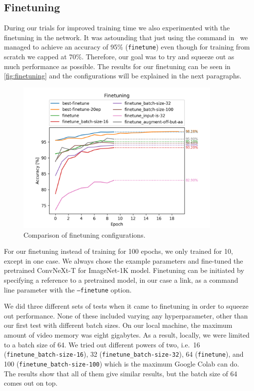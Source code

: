 \documentclass{article}
\begin{document}
    \subsection{Finetuning}\label{subsec:finetuning}
    During our trials for improved training time we also experimented with the finetuning in the network.
    It was astounding that just using the command in~\cite{ayush0finetune} we managed to achieve an accuracy of 95\% (\texttt{finetune}) even though for training from scratch we capped at 70\%.
    Therefore, our goal was to try and squeeze out as much performance as possible.
    The results for our finetuning can be seen in \autoref{fig:finetuning} and the configurations will be explained in the next paragraphs.
    \begin{figure}[h]
        \centering
        \includegraphics[width=0.9\textwidth]{images/finetuning}
        \caption{Comparison of finetuning configurations.}
        \label{fig:finetuning}
    \end{figure}

    For our finetuning instead of training for 100 epochs, we only trained for 10, except in one case.
    We always chose the example parameters and fine-tuned the pretrained ConvNeXt-T for ImageNet-1K model\cite{repository}.
    Finetuning can be initiated by specifying a reference to a pretrained model, in our case a link, as a command line parameter with the \texttt{--finetune} option.

    We did three different sets of tests when it came to finetuning in order to squeeze out performance.
    None of these included varying any hyperparameter, other than our first test with different batch sizes.
    On our local machine, the maximum amount of video memory was eight gigabytes.
    As a result, locally, we were limited to a batch size of 64.
    We tried out different powers of two, i.e.\ 16 (\texttt{finetune\_batch-size-16}), 32 (\texttt{finetune\_batch-size-32}), 64 (\texttt{finetune}), and 100 (\texttt{finetune\_batch-size-100}) which is the maximum Google Colab can do.
    The results show that all of them give similar results, but the batch size of 64 comes out on top.
\end{document}

